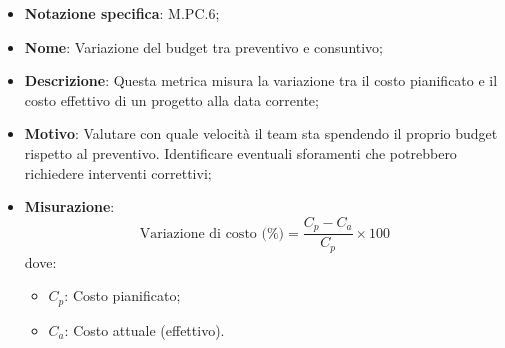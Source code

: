 \begin{itemize}
    \item \textbf{Notazione specifica}: M.PC.6;
    \item \textbf{Nome}: Variazione del budget tra preventivo e consuntivo;
    \item \textbf{Descrizione}: Questa metrica misura la variazione tra il costo pianificato e il costo effettivo di un progetto alla data corrente;
    \item \textbf{Motivo}: Valutare con quale velocità il team sta spendendo il proprio budget rispetto al preventivo. Identificare eventuali sforamenti che potrebbero richiedere interventi correttivi;
    \item \textbf{Misurazione}:
    \[
        \text{Variazione di costo (\%)} =\frac{C_p - C_a}{C_p} \times 100
    \]
    dove:
    \begin{itemize}
        \item $C_{p}$: Costo pianificato;
        \item $C_{a}$: Costo attuale (effettivo).
    \end{itemize}
\end{itemize}

